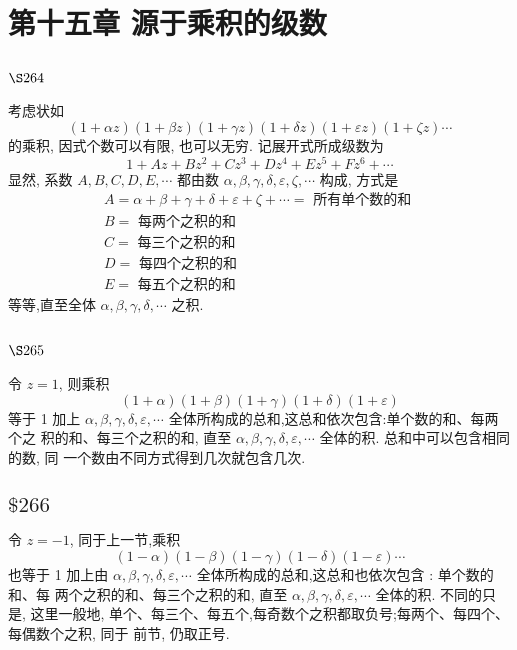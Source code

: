 \chapter{第十五章 源于乘积的级数}

\section{$\S 264$}

考虑状如
\[
(1+\alpha z)(1+\beta z)(1+\gamma z)(1+\delta z)(1+\varepsilon z)(1+\zeta z) \cdots
\]
的乘积, 因式个数可以有限, 也可以无穷. 记展开式所成级数为
\[
1+A z+B z^{2}+C z^{3}+D z^{4}+E z^{5}+F z^{6}+\cdots
\]
显然, 系数 $A, B, C, D, E, \cdots$ 都由数 $\alpha, \beta, \gamma, \delta, \varepsilon, \zeta, \cdots$ 构成, 方式是
\[
\begin{gathered}
A=\alpha+\beta+\gamma+\delta+\varepsilon+\zeta+\cdots=\text { 所有单个数的和 } \\
B=\text { 每两个之积的和 } \\
C=\text { 每三个之积的和 } \\
D=\text { 每四个之积的和 } \\
E=\text { 每五个之积的和 }
\end{gathered}
\]
等等,直至全体 $\alpha, \beta, \gamma, \delta, \cdots$ 之积.

\section{$\S 265$}

令 $z=1$, 则乘积
\[
(1+\alpha)(1+\beta)(1+\gamma)(1+\delta)(1+\varepsilon)
\]
等于 1 加上 $\alpha, \beta, \gamma, \delta, \varepsilon, \cdots$ 全体所构成的总和,这总和依次包含:单个数的和、每两个之 积的和、每三个之积的和, 直至 $\alpha, \beta, \gamma, \delta, \varepsilon, \cdots$ 全体的积. 总和中可以包含相同的数, 同 一个数由不同方式得到几次就包含几次.

\section{$\$ 266$}

令 $z=-1$, 同于上一节,乘积
\[
(1-\alpha)(1-\beta)(1-\gamma)(1-\delta)(1-\varepsilon) \cdots
\]
也等于 1 加上由 $\alpha, \beta, \gamma, \delta, \varepsilon, \cdots$ 全体所构成的总和,这总和也依次包含 : 单个数的和、每 两个之积的和、每三个之积的和, 直至 $\alpha, \beta, \gamma, \delta, \varepsilon, \cdots$ 全体的积. 不同的只是, 这里一般地, 单个、每三个、每五个,每奇数个之积都取负号;每两个、每四个、每偶数个之积, 同于 前节, 仍取正号.

